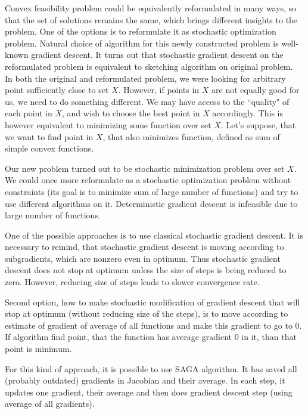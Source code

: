 \documentclass[11pt]{book}
\begin{document}
Convex feasibility problem could be equivalently reformulated in many ways, so that the set of solutions remains the same, which brings different insights to the problem. One of the options is to reformulate it as stochastic optimization problem. Natural choice of algorithm for this newly constructed problem is well-known gradient descent. It turns out that stochastic gradient descent on the reformulated problem is equivalent to sketching algorithm on original problem\cite{sketchAndProject,projectionFeasibility}.\\

In both the original and reformulated problem, we were looking for arbitrary point sufficiently close to set $X$. However, if points in $X$ are not equally good for us, we need to do something different. We may have access to the ``quality" of each point in $X$, and wish to choose the best point in $X$ accordingly. This is however equivalent to minimizing some function over set $X$. Let's suppose, that we want to find point in $X$, that also minimizes function, defined as sum of simple convex functions.

Our new problem turned out to be stochastic minimization problem over set $X$. We could once more reformulate as a stochastic optimization problem without constraints (its goal is to minimize sum of large number of functions) and try to use different algorithms on it\cite{kosto}. Deterministic gradient descent is infeasible due to large number of functions.

One of the possible approaches is to use classical stochastic gradient descent. It is necessary to remind, that stochastic gradient descent is moving according to subgradients, which are nonzero even in optimum. Thus stochastic gradient descent does not stop at optimum unless the size of steps is being reduced to zero. However, reducing size of steps leads to slower convergence rate\cite{SGD}.

Second option, how to make stochastic modification of gradient descent that will stop at optimum (without reducing size of the steps), is to move according to estimate of gradient of average of all functions and make this gradient to go to $0$. If algorithm find point, that the function has average gradient $0$  in it, than that point is minimum. 

For this kind of approach, it is possible to use SAGA algorithm\cite{SAGA}. It has saved all (probably outdated) gradients in Jacobian and their average. In each step, it updates one gradient, their average and then does gradient descent step (using average of all gradients). 
\end{document}
